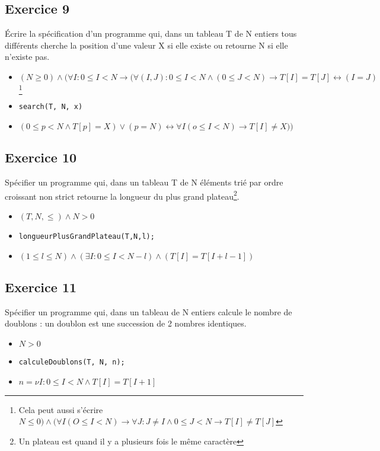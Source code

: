 \subsection{Exercice 9}
	\'Ecrire la spécification d'un programme qui, dans un tableau T de N entiers tous différents cherche la position d'une valeur X si elle existe ou retourne N si elle n'existe pas.

	\begin{itemize}
		\item $(N\geq0) \wedge (\forall I : 0 \leq I < N \rightarrow (\forall (I, J) : 0 \leq I < N \wedge (0 \leq J < N) \rightarrow T[I] = T[J] \leftrightarrow (I = J)$\footnote{Cela peut aussi s'écrire $N\leq 0) \wedge (\forall I (O \leq I < N) \rightarrow \forall J : J \neq I \wedge 0 \leq J < N \rightarrow T[I] \neq T[J]$}
		\item \texttt{search(T, N, x)}
		\item $(0 \leq p < N \wedge T[p] = X) \vee (p=N) \leftrightarrow \forall I (o\leq I < N) \rightarrow T[I] \neq X))$ 
	\end{itemize}

	\subsection{Exercice 10}
	Spécifier un programme qui, dans un tableau T de N éléments trié par ordre croissant non strict retourne la longueur du plus grand plateau\footnote{Un plateau est quand il y a plusieurs fois le même caractère}.

\begin{itemize}
	\item $(T, N, \leq) \wedge N > 0$
	\item \texttt{longueurPlusGrandPlateau(T,N,l);}
	\item $(1 \leq l \leq N) \wedge (\exists I : 0 \leq I < N-l)\wedge (T[I] = T[I+l-1])$ 
\end{itemize}
	\subsection{Exercice 11}
		Spécifier un programme qui, dans un tableau de N entiers calcule le nombre de doublons : un doublon est une succession de 2 nombres identiques.

		\begin{itemize}
			\item $N > 0$
			\item \texttt{calculeDoublons(T, N, n);}
			\item $n = \nu I : 0 \leq I < N \wedge T[I] = T[I+1]$
		\end{itemize}

